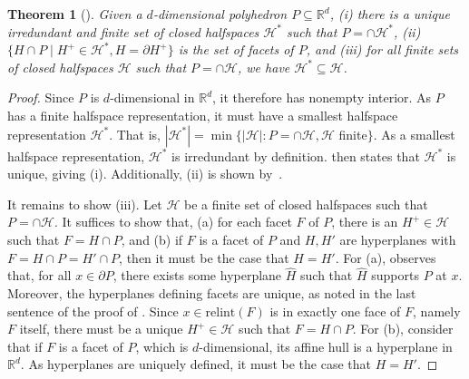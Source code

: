 \documentclass[11pt]{article}
\newcommand{\Comments}{1}
\newcommand{\mynote}[2]{\ifnum\Comments=1\textcolor{#1}{#2}\fi}
\newcommand{\mytodo}[2]{\ifnum\Comments=1%
  \todo[linecolor=#1!80!black,backgroundcolor=#1,bordercolor=#1!80!black]{#2}\fi}
\newcommand{\raft}[1]{\mytodo{green!20!white}{RF: #1}}
\newcommand{\jessie}[1]{\mynote{teal}{[JF: #1]}}
\newcommand{\reals}{\mathbb{R}}
\renewcommand{\H}{\mathcal{H}}
\newcommand{\relint}{\mathrm{relint}}
\newtheorem{theorem}{Theorem}
\begin{document}
\begin{theorem}[{\citet{gallier2008notes}}]\label{thm:polyhedron-uniquely-gen-facets}
  Given a $d$-dimensional polyhedron $P \subseteq \reals^d$, 
  (i) there is a unique irredundant and finite set of closed halfspaces $\H^*$ such that $P = \cap \H^*$, 
  (ii) $\{H \cap P \mid H^+ \in \H^*, H = \partial H^+\}$ is the set of facets of $P$, and
  (iii) for all finite sets of closed halfspaces $\H$ such that $P = \cap \H$, we have $\H^* \subseteq \H$.
\end{theorem}
\begin{proof}
	Since $P$ is $d$-dimensional in $\reals^d$, it therefore has nonempty interior.
	As $P$ has a finite halfspace representation, it must have a smallest halfspace representation $\H^*$.
	That is, $|\H^*| = \min \{|\H| : P = \cap \H, \H$ finite$\}$.
	As a smallest halfspace representation, $\H^*$ is irredundant by definition.
	\citet[Proposition 4.5(i)]{gallier2008notes} then states that $\H^*$ is unique, giving (i).
	Additionally, (ii) is shown by~\citep[Proposition 4.5(ii)]{gallier2008notes}.
	

	It remains to show (iii).
	Let $\H$ be a finite set of closed halfspaces such that $P = \cap \H$.
	It suffices to show that, (a) for each facet $F$ of $P$, there is an $H^+ \in \H$ such that $F = H\cap P$, and (b) if $F$ is a facet of $P$ and $H,H'$ are hyperplanes with $F = H \cap P = H' \cap P$, then it must be the case that $H = H'$.
	For (a), \citet[Proposition 3.17]{gallier2008notes} observes that, for all $x \in \partial P$, there exists some hyperplane $\hat H$ such that $\hat H$ supports $P$ at $x$.
	Moreover, the hyperplanes defining facets are unique, as noted in the last sentence of the proof of \citep[Proposition 4.5]{gallier2008notes}.
	Since $x \in \relint(F)$ is in exactly one face of $F$, namely $F$ itself, there must be a unique $H^+ \in \H$ such that $F = H \cap P$.
	For (b), consider that if $F$ is a facet of $P$, which is $d$-dimensional, its affine hull is a hyperplane in $\reals^d$.
	As hyperplanes are uniquely defined, it must be the case that $H = H'$.

		

\end{proof}
\end{document}
